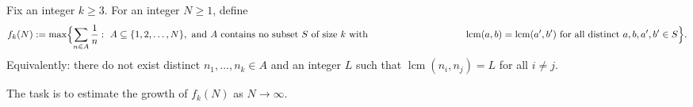 Fix an integer $k\ge 3$.
For an integer $N\ge 1$, define
\[
  f_k(N):=\max\Bigl\{\sum_{n\in A}\frac{1}{n}:\ A\subseteq\{1,2,\dots,N\},\ \text{and $A$ contains no subset $S$ of size $k$ with}\ \\
  \qquad\qquad\qquad\qquad\qquad \operatorname{lcm}(a,b)=\operatorname{lcm}(a',b')\ \text{for all distinct }a,b,a',b'\in S\Bigr\}.
\]
Equivalently: there do not exist distinct $n_1,\dots,n_k\in A$ and an integer $L$ such that $\operatorname{lcm}(n_i,n_j)=L$ for all $i\ne j$.

The task is to estimate the growth of $f_k(N)$ as $N\to\infty$.
